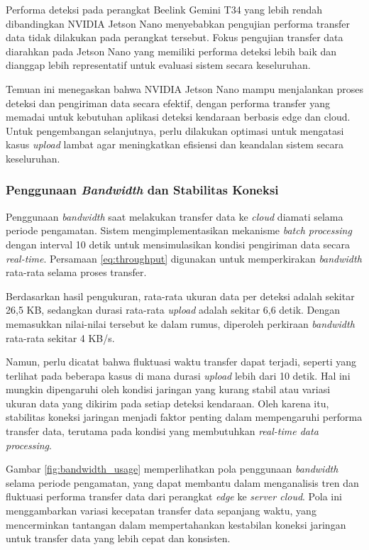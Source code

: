 Performa deteksi pada perangkat Beelink Gemini T34 yang lebih rendah dibandingkan NVIDIA Jetson Nano menyebabkan pengujian performa transfer data tidak dilakukan pada perangkat tersebut. Fokus pengujian transfer data diarahkan pada Jetson Nano yang memiliki performa deteksi lebih baik dan dianggap lebih representatif untuk evaluasi sistem secara keseluruhan.

Temuan ini menegaskan bahwa NVIDIA Jetson Nano mampu menjalankan proses deteksi dan pengiriman data secara efektif, dengan performa transfer yang memadai untuk kebutuhan aplikasi deteksi kendaraan berbasis edge dan cloud. Untuk pengembangan selanjutnya, perlu dilakukan optimasi untuk mengatasi kasus \emph{upload} lambat agar meningkatkan efisiensi dan keandalan sistem secara keseluruhan.

\subsubsection{Penggunaan \emph{Bandwidth} dan Stabilitas Koneksi}

Penggunaan \emph{bandwidth} saat melakukan transfer data ke \emph{cloud} diamati selama periode pengamatan. Sistem mengimplementasikan mekanisme \emph{batch processing} dengan interval 10 detik untuk mensimulasikan kondisi pengiriman data secara \emph{real-time}. Persamaan \ref{eq:throughput} digunakan untuk memperkirakan \emph{bandwidth} rata-rata selama proses transfer.

Berdasarkan hasil pengukuran, rata-rata ukuran data per deteksi adalah sekitar 26,5 KB, sedangkan durasi rata-rata \emph{upload} adalah sekitar 6,6 detik. Dengan memasukkan nilai-nilai tersebut ke dalam rumus, diperoleh perkiraan \emph{bandwidth} rata-rata sekitar 4 KB/s.

Namun, perlu dicatat bahwa fluktuasi waktu transfer dapat terjadi, seperti yang terlihat pada beberapa kasus di mana durasi \emph{upload} lebih dari 10 detik. Hal ini mungkin dipengaruhi oleh kondisi jaringan yang kurang stabil atau variasi ukuran data yang dikirim pada setiap deteksi kendaraan. Oleh karena itu, stabilitas koneksi jaringan menjadi faktor penting dalam mempengaruhi performa transfer data, terutama pada kondisi yang membutuhkan \emph{real-time data processing}.

Gambar \ref{fig:bandwidth_usage} memperlihatkan pola penggunaan \emph{bandwidth} selama periode pengamatan, yang dapat membantu dalam menganalisis tren dan fluktuasi performa transfer data dari perangkat \emph{edge} ke \emph{server cloud}. Pola ini menggambarkan variasi kecepatan transfer data sepanjang waktu, yang mencerminkan tantangan dalam mempertahankan kestabilan koneksi jaringan untuk transfer data yang lebih cepat dan konsisten.

